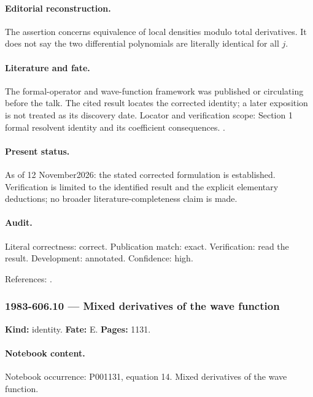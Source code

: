 \paragraph{Editorial reconstruction.} The assertion concerns equivalence of local densities modulo total derivatives. It does not say the two differential polynomials are literally identical for all \(j\).

\paragraph{Literature and fate.} The formal-operator and wave-function framework was published or circulating before the talk. The cited result locates the corrected identity; a later exposition is not treated as its discovery date. Locator and verification scope: Section 1 formal resolvent identity and its coefficient consequences. \cite{cherednik1978differential}.

\paragraph{Present status.} As of 12 November2026: the stated corrected formulation is established. Verification is limited to the identified result and the explicit elementary deductions; no broader literature-completeness claim is made.

\paragraph{Audit.} Literal correctness: correct. Publication match: exact. Verification: read the result. Development: annotated. Confidence: high.

\noindent References: \citep{cherednik1978differential}.\par

\subsubsection{1983-606.10 --- Mixed derivatives of the wave function}

\label{item:1983-606.10}

\noindent\textbf{Kind:} identity. \textbf{Fate:} E. \textbf{Pages:} 1131.\par

\paragraph{Notebook content.} Notebook occurrence: P001131, equation 14. Mixed derivatives of the wave function.

